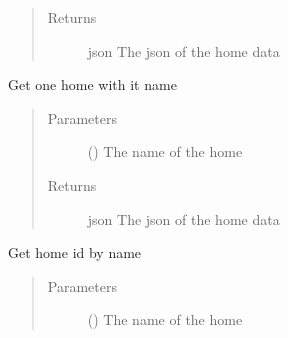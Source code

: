 \documentclass[letterpaper,10pt,english]{sphinxmanual}
\begin{document}
\begin{fulllineitems}
\begin{fulllineitems}
\begin{quote}
\begin{description}
\item[{Returns}] \leavevmode
\sphinxAtStartPar
json \textendash{} The json of the home data

\end{description}\end{quote}

\end{fulllineitems}


\begin{fulllineitems}
\label{\detokenize{index:Api.Api.get_home_by_name}}
\sphinxAtStartPar
Get one home with it name
\begin{quote}\begin{description}
\item[{Parameters}] \leavevmode
\sphinxAtStartPar
{} () \textendash{} The name of the home

\item[{Returns}] \leavevmode
\sphinxAtStartPar
json \textendash{} The json of the home data

\end{description}\end{quote}

\end{fulllineitems}


\begin{fulllineitems}
\label{\detokenize{index:Api.Api.get_home_id_by_name}}
\sphinxAtStartPar
Get home id by name
\begin{quote}\begin{description}
\item[{Parameters}] \leavevmode
\sphinxAtStartPar
{} () \textendash{} The name of the home


\end{description}
\end{quote}
\end{fulllineitems}
\end{fulllineitems}
\end{document}
